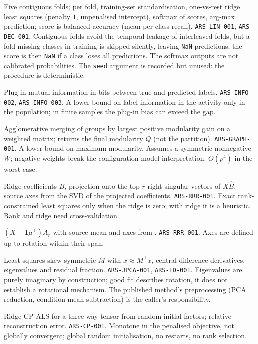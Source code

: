 {Five contiguous folds; per fold, training-set standardisation, one-vs-rest ridge least squares (penalty $1$, unpenalised intercept), softmax of scores, arg-max prediction; score is balanced accuracy (mean per-class recall).}
{\texttt{ARS-LIN-001}, \texttt{ARS-DEC-001}.}
{Contiguous folds avoid the temporal leakage of interleaved folds, but a fold missing classes in training is skipped silently, leaving \texttt{NaN} predictions; the score is then \texttt{NaN} if a class loses all predictions. The softmax outputs are not calibrated probabilities. The \texttt{seed} argument is recorded but unused: the procedure is deterministic.}

{Plug-in mutual information in bits between true and predicted labels.}
{\texttt{ARS-INFO-002}, \texttt{ARS-INFO-003}.}
{A lower bound on label information in the activity only in the population; in finite samples the plug-in bias can exceed the gap.}

{Agglomerative merging of groups by largest positive modularity gain on a weighted matrix; returns the final modularity $Q$ (not the partition).}
{\texttt{ARS-GRAPH-001}.}
{A lower bound on maximum modularity. Assumes a symmetric nonnegative $W$; negative weights break the configuration-model interpretation. $O(p^4)$ in the worst case.}

{Ridge coefficients $\hat B$, projection onto the top $r$ right singular vectors of $X\hat B$, source axes from the SVD of the projected coefficients.}
{\texttt{ARS-RRR-001}.}
{Exact rank-constrained least squares only when the ridge is zero; with ridge it is a heuristic. Rank and ridge need cross-validation.}

{$(X-\mathbf 1\mu^\top)A_r$ with source mean and axes from .}
{\texttt{ARS-RRR-001}.}
{Axes are defined up to rotation within their span.}

{Least-squares skew-symmetric $M$ with $\dot x\approx M^\top x$, central-difference derivatives, eigenvalues and residual fraction.}
{\texttt{ARS-JPCA-001}, \texttt{ARS-FD-001}.}
{Eigenvalues are purely imaginary by construction; good fit describes rotation, it does not establish a rotational mechanism. The published method's preprocessing (PCA reduction, condition-mean subtraction) is the caller's responsibility.}

{Ridge CP-ALS for a three-way tensor from random initial factors; relative reconstruction error.}
{\texttt{ARS-CP-001}.}
{Monotone in the penalised objective, not globally convergent; global random initialisation, no restarts, no rank selection.}

